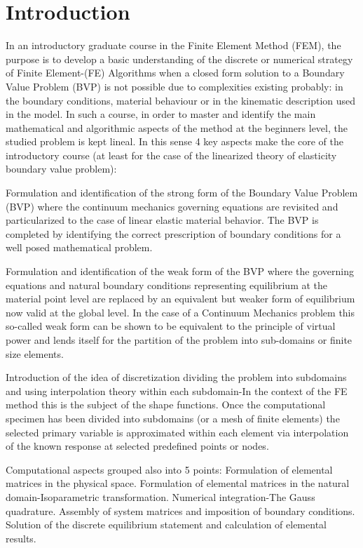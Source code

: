 %
\cleardoublepage {}
{}
\chapter{Introduction}

In an introductory graduate course in the Finite Element Method (FEM), the purpose is to develop a basic understanding of the discrete or numerical strategy of Finite Element-(FE) Algorithms when a closed form solution to a Boundary Value Problem (BVP) is not possible due to complexities existing probably: in the boundary conditions, material behaviour or in the kinematic description used in the model. In such a course, in order to master and identify the main mathematical and algorithmic aspects of the method at the beginners level, the studied problem is kept lineal. In this sense 4 key aspects make the core of the introductory course (at least for the case of the linearized theory of elasticity boundary value problem):

Formulation and identification of the strong form of the Boundary Value Problem (BVP) where the continuum mechanics governing equations are revisited and particularized to the case of linear elastic material behavior. The BVP is completed by identifying the correct prescription of boundary conditions for a well posed mathematical problem.

Formulation and identification of the weak form of the BVP where the governing equations and natural boundary conditions representing equilibrium at the material point level are replaced by an equivalent but weaker form of equilibrium now valid at the global level.  In the case of a Continuum Mechanics problem this so-called weak form can be shown to be equivalent to the principle of virtual power and lends itself for the partition of the problem into sub-domains or finite size elements.

Introduction of the idea of discretization dividing the problem into subdomains and using interpolation theory within each subdomain-In the context of the FE method this is the subject of the shape functions. Once the computational specimen has been divided into subdomains (or a mesh of finite elements) the selected primary variable is approximated within each element via interpolation of the known response at selected predefined points or nodes.

 Computational aspects grouped also into 5 points:
	Formulation of elemental matrices in the physical space.
	Formulation of elemental matrices in the natural domain-Isoparametric transformation.
	Numerical integration-The Gauss quadrature.
	Assembly of system matrices and imposition of boundary conditions.
	Solution of the discrete equilibrium statement and calculation of elemental results.

